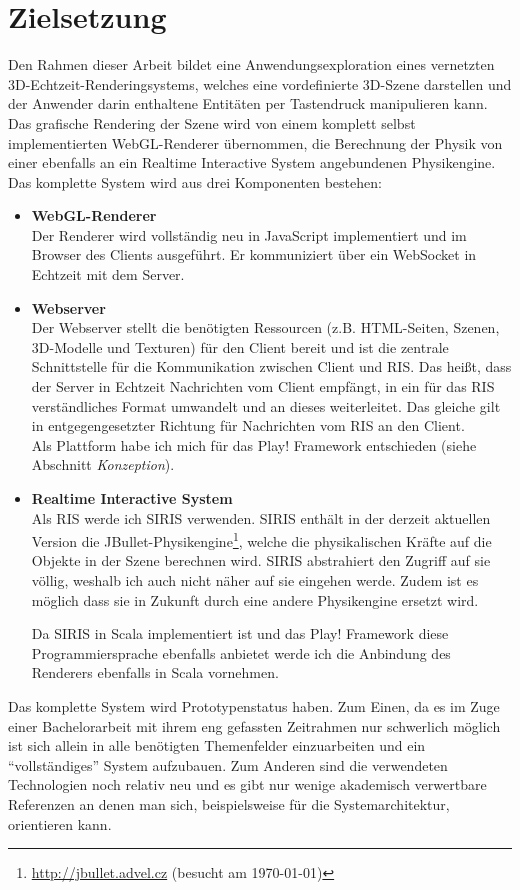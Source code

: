 \section{Zielsetzung}
\label{sec:zielsetzung}
Den Rahmen dieser Arbeit bildet eine Anwendungsexploration eines vernetzten 3D-Echtzeit-Renderingsystems, welches eine vordefinierte 3D-Szene darstellen und der Anwender darin enthaltene Entitäten per Tastendruck manipulieren kann. Das grafische Rendering der Szene wird von einem komplett selbst implementierten WebGL-Renderer übernommen, die Berechnung der Physik von einer ebenfalls an ein Realtime Interactive System angebundenen Physikengine. Das komplette System wird aus drei Komponenten bestehen:
\begin{itemize}
    \item \textbf{WebGL-Renderer}\\
Der Renderer wird vollständig neu in JavaScript implementiert und im Browser des Clients ausgeführt. Er kommuniziert über ein WebSocket in Echtzeit mit dem Server.
    \item \textbf{Webserver}\\
Der Webserver stellt die benötigten Ressourcen (z.B. HTML-Seiten, Szenen, 3D-Modelle und Texturen) für den Client bereit und ist die zentrale Schnittstelle für die Kommunikation zwischen Client und RIS. Das heißt, dass der Server in Echtzeit Nachrichten vom Client empfängt, in ein für das RIS verständliches Format umwandelt und an dieses weiterleitet. Das gleiche gilt in entgegengesetzter Richtung für Nachrichten vom RIS an den Client.\\
Als Plattform habe ich mich für das Play! Framework entschieden (siehe Abschnitt \textit{Konzeption}).
    \item \textbf{Realtime Interactive System}\\
Als RIS werde ich SIRIS verwenden. SIRIS enthält in der derzeit aktuellen Version die JBullet-Physikengine\footnote{\url{http://jbullet.advel.cz} (besucht am \today)}, welche die physikalischen Kräfte auf die Objekte in der Szene berechnen wird. SIRIS abstrahiert den Zugriff auf sie völlig, weshalb ich auch nicht näher auf sie eingehen werde. Zudem ist es möglich dass sie in Zukunft durch eine andere Physikengine ersetzt wird.

Da SIRIS in Scala implementiert ist und das Play! Framework diese Programmiersprache ebenfalls anbietet werde ich die Anbindung des Renderers ebenfalls in Scala vornehmen.
\end{itemize}
Das komplette System wird Prototypenstatus haben. Zum Einen, da es im Zuge einer Bachelorarbeit mit ihrem eng gefassten Zeitrahmen nur schwerlich möglich ist sich allein in alle benötigten Themenfelder einzuarbeiten und ein "`vollständiges"' System aufzubauen. Zum Anderen sind die verwendeten Technologien noch relativ neu und es gibt nur wenige akademisch verwertbare Referenzen an denen man sich, beispielsweise für die Systemarchitektur, orientieren kann.
